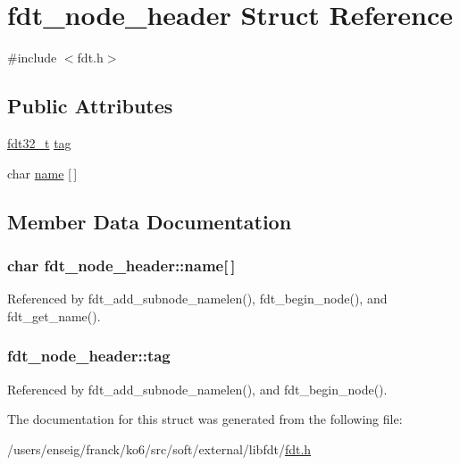 \hypertarget{structfdt__node__header}{\section{fdt\-\_\-node\-\_\-header Struct Reference}
\label{structfdt__node__header}
}


{\ttfamily \#include $<$fdt.\-h$>$}

\subsection*{Public Attributes}
\begin{DoxyCompactItemize}
\item 
\hyperlink{libfdt__env_8h_a76887ac8786252752fb3f9a39b21f3af}{fdt32\-\_\-t} \hyperlink{structfdt__node__header_a073164a8ce430c15d2147ccba6bc7340}{tag}
\item 
char \hyperlink{structfdt__node__header_a7b13eaf331db0c09640dc3d208c7efcd}{name} \mbox{[}$\,$\mbox{]}
\end{DoxyCompactItemize}


\subsection{Member Data Documentation}
\hypertarget{structfdt__node__header_a7b13eaf331db0c09640dc3d208c7efcd}{
\subsubsection[{name}]{\setlength{\rightskip}{0pt plus 5cm}char fdt\-\_\-node\-\_\-header\-::name\mbox{[}$\,$\mbox{]}}}\label{structfdt__node__header_a7b13eaf331db0c09640dc3d208c7efcd}


Referenced by fdt\-\_\-add\-\_\-subnode\-\_\-namelen(), fdt\-\_\-begin\-\_\-node(), and fdt\-\_\-get\-\_\-name().

\hypertarget{structfdt__node__header_a073164a8ce430c15d2147ccba6bc7340}{
\subsubsection[{tag}]{ fdt\-\_\-node\-\_\-header\-::tag}}\label{structfdt__node__header_a073164a8ce430c15d2147ccba6bc7340}


Referenced by fdt\-\_\-add\-\_\-subnode\-\_\-namelen(), and fdt\-\_\-begin\-\_\-node().



The documentation for this struct was generated from the following file\-:\begin{DoxyCompactItemize}
\item 
/users/enseig/franck/ko6/src/soft/external/libfdt/\hyperlink{fdt_8h}{fdt.\-h}\end{DoxyCompactItemize}
